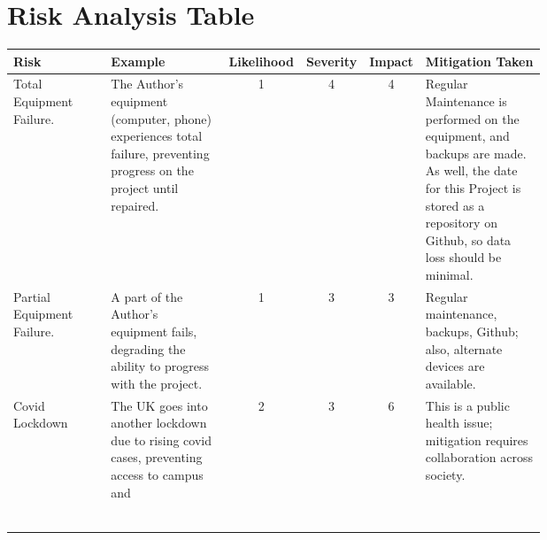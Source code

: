 \documentclass[11pt, a4paper, notitlepage]{report}
\begin{document}
\chapter{Risk Analysis Table}\label{app:RiskAnalysis}
\begin{tabular}{|p{0.2\linewidth}|p{0.25\linewidth}|c|c|c|p{0.25\linewidth}|}
	\hline
	\small Risk & \small Example & \small Likelihood & \small Severity & \small 
	Impact 
	& \small Mitigation Taken \\
	\hline
	\small Total Equipment Failure. & \small The Author's equipment (computer, 
	phone) 
	experiences total failure, preventing progress on the project until 
	repaired. & 1 & 4 & 4 & \small Regular Maintenance is performed on the 
	equipment, and backups are made. As well, the date for this Project is 
	stored as a repository on Github, so data loss should be minimal. \\
	
	\small Partial Equipment Failure. & \small A part of the Author's equipment 
	fails, degrading the ability to progress with the project. & 1 & 3 & 3 & 
	\small Regular maintenance, backups, Github; also, alternate devices are 
	available. \\
	
	\small Covid Lockdown & The UK goes into another lockdown due to rising 
	covid cases, preventing access to campus and  & 2 & 3 & 6 & This is a 
	public health issue; mitigation requires collaboration across society.\\
	
	&  &  &  &  &  \\
	
	&  &  &  &  &  \\
	
	&  &  &  &  &  \\
	
	&  &  &  &  &  \\
	
	&  &  &  &  &  \\

	&  &  &  &  &  \\
	\hline
\end{tabular}
\end{document}
